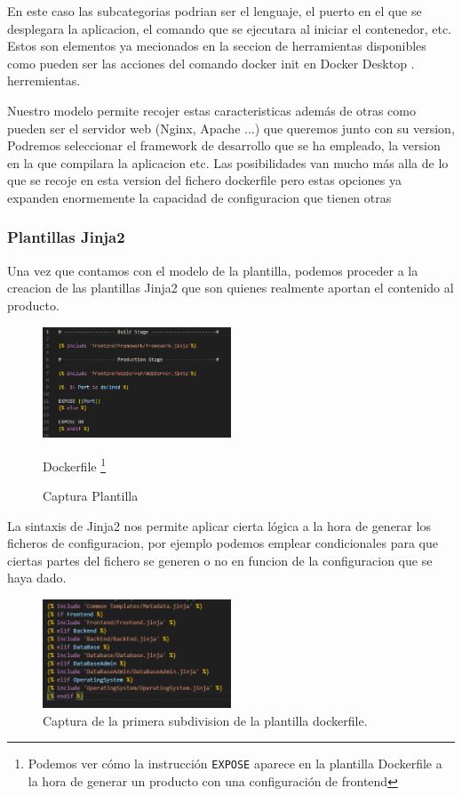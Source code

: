 \documentclass[12pt, a4paper, twoside]{article}
\begin{document}
En este caso las subcategorias podrian ser el lenguaje, el puerto en el que se desplegara la aplicacion, el comando que se ejecutara al iniciar el contenedor, etc.
Estos son elementos ya mecionados en la seccion de herramientas disponibles como pueden ser las acciones del comando docker init en Docker Desktop \cite{docker_desktop}. 
herremientas. 
  

Nuestro modelo permite recojer estas caracteristicas además de otras 
como pueden ser el servidor web (Nginx, Apache ...) que queremos junto con su version, Podremos seleccionar el framework de desarrollo que se ha empleado, la version en la que compilara la aplicacion etc.
Las posibilidades van mucho más alla de lo que se recoje en esta version del fichero dockerfile pero estas opciones ya expanden enormemente la capacidad de configuracion que tienen otras 



\subsubsection{Plantillas Jinja2}
Una vez que contamos con el modelo de la plantilla, podemos proceder a la creacion de las plantillas Jinja2 que son quienes realmente aportan el contenido al producto.

\begin{figure}[h]
	\centering
	  \includegraphics[width=0.5\textwidth]{dockerfile.frontend.jinja.template.png}
	\caption{Captura Plantilla } Dockerfile  \footnote{Podemos ver cómo la instrucción \texttt{EXPOSE} aparece en la plantilla Dockerfile a la hora de generar un producto con una configuración de frontend} 
\end{figure}

La sintaxis de Jinja2 nos permite aplicar cierta lógica a la hora de generar los ficheros de configuracion, por ejemplo podemos emplear condicionales para que ciertas partes del fichero se generen o no en funcion de la configuracion que se haya dado.
\begin{figure}[h]
	\centering
	  \includegraphics[width=0.5\textwidth]{dockerfile.logica.plantillas.jinja.png}
	\caption{Captura de la primera subdivision de la plantilla dockerfile.}
\end{figure}
\end{document}

